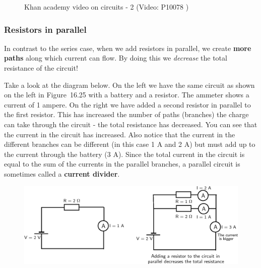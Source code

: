     \noindent
    \setcounter{subfigure}{0}
	\begin{figure}[H] %
    \textnormal{Khan academy video on circuits - 2}\vspace{.1in} \nopagebreak
  \label{m38776*yt-media2}\label{m38776*yt-video2}
             { (Video:  P10078 )}
      \vspace{2pt}
    \vspace{.1in}
 \end{figure}       
        \label{m38776*uid67}
            \subsubsection{ Resistors in parallel}
            \nopagebreak
          \label{m38776*id67501}In contrast to the series case, when we add resistors in parallel, we create \textbf{more paths} along which current can flow. By doing this we \textsl{decrease} the total resistance of the circuit!\par 
          \label{m38776*id67518}Take a look at the diagram below. On the left we have the same circuit as shown on the left in Figure~16.25 with a battery and a resistor. The ammeter shows a current of 1 ampere. On the right we have added a second resistor in parallel to the first resistor. This has increased the number of paths (branches) the charge can take through the circuit - the total resistance has decreased. You can see that the current in the circuit has increased. Also notice that the current in the different branches can be different (in this case 1 A and 2 A) but must add up to the current through the battery (3 A). Since the total current in the circuit is equal to the sum of the currents in the parallel branches, a parallel circuit is sometimes called a \textbf{current divider}.\par 
          \label{m38776*id67525}
    \setcounter{subfigure}{0}
	\begin{figure}[H] %
    \begin{center}
    \label{m38776*id67528!!!underscore!!!media}\label{m38776*id67528!!!underscore!!!printimage}\includegraphics{col11305.imgs/m38776_PG10C9_033.png} %
      \vspace{2pt}
    \vspace{.1in}
    \end{center}
 \end{figure}       
